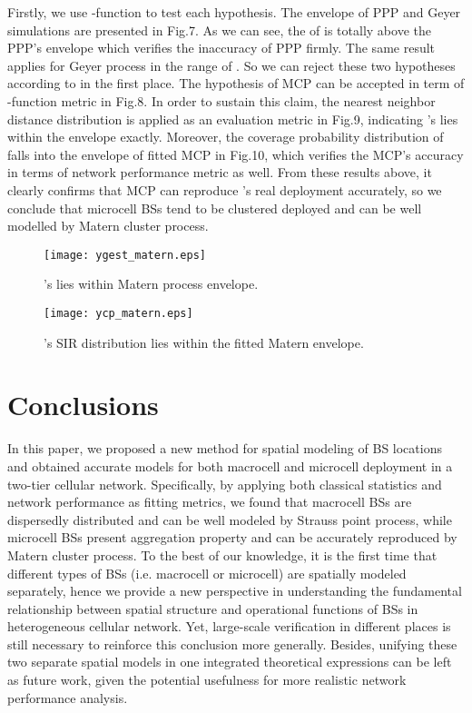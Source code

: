 \documentclass[conference]{IEEEtran}
\begin{document}
Firstly, we use -function to test each hypothesis. The envelope of PPP and Geyer simulations are presented in Fig.7. As we can see, the  of  is totally above the PPP's envelope which verifies the inaccuracy of PPP firmly. The same result applies for Geyer process in the range of . So we can reject these two hypotheses according to  in the first place. The hypothesis of MCP can be accepted in term of -function metric in Fig.8. In order to sustain this claim, the nearest neighbor distance distribution is applied as an evaluation metric in Fig.9, indicating 's  lies within the envelope exactly. Moreover, the coverage probability distribution of  falls into the envelope of fitted MCP in Fig.10, which verifies the MCP's accuracy in terms of network performance metric as well. From these results above, it clearly confirms that MCP can reproduce 's real deployment accurately, so we conclude that microcell BSs tend to be clustered deployed and can be well modelled by Matern cluster process.

\begin{figure}[!t]
\centering
\texttt{[image: ygest\_matern.eps]}
\caption{'s  lies within Matern process envelope.}
\end{figure}

\begin{figure}[!t]
\centering
\texttt{[image: ycp\_matern.eps]}
\caption{'s SIR distribution lies within the fitted Matern envelope.}
\end{figure}

\section{Conclusions}
In this paper, we proposed a new method for spatial modeling of BS locations and obtained accurate models for both macrocell and microcell deployment in a two-tier cellular network. Specifically, by applying both classical statistics and network performance as fitting metrics, we found that macrocell BSs are dispersedly distributed and can be well modeled by Strauss point process, while microcell BSs present aggregation property and can be accurately reproduced by Matern cluster process.
To the best of our knowledge, it is the first time that different types of BSs (i.e. macrocell or microcell) are spatially modeled separately, hence we provide a new perspective in understanding the fundamental relationship between spatial structure and operational functions of BSs in heterogeneous cellular network. Yet, large-scale verification in different places is still necessary to reinforce this conclusion more generally. Besides, unifying these two separate spatial models in one integrated theoretical expressions can be left as future work, given the potential usefulness for more realistic network performance analysis.
\end{document}

